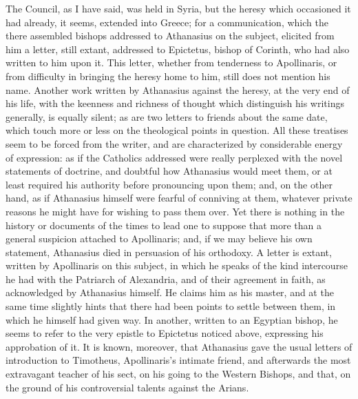 The Council, as I have said, was held in Syria, but the heresy
which occasioned it had already, it seems, extended into Greece; for a
communication, which the there assembled bishops addressed to
Athanasius on the subject, elicited from him a letter, still extant,
addressed to Epictetus, bishop of Corinth, who had also written to
him upon it. This letter, whether from tenderness to Apollinaris,
or from difficulty in bringing the heresy home to him, still does not
mention his name. Another work written by Athanasius against the
heresy, at the very end of his life, with the keenness and richness of
thought which distinguish his writings generally, is equally silent;
as are two letters to friends about the same date, which touch more or
less on the theological points in question. All these treatises seem
to be forced from the writer, and are characterized by considerable
energy of expression: as if the Catholics addressed were really
perplexed with the novel statements of doctrine, and doubtful how
Athanasius would meet them, or at least required his authority before
pronouncing upon them; and, on the other hand, as if Athanasius
himself were fearful of conniving at them, whatever private reasons he
might have for wishing to pass them over. Yet there is nothing in the
history or documents of the times to lead one to suppose that more
than a general suspicion attached to Apollinaris; and, if we may
believe his own statement, Athanasius died in persuasion of his
orthodoxy. A letter is extant, written by Apollinaris on this subject,
in which he speaks of the kind intercourse he had with the Patriarch
of Alexandria, and of their agreement in faith, as acknowledged by
Athanasius himself. He claims him as his master, and at the same time
slightly hints that there had been points to settle between them, in
which he himself had given way. In another, written to an Egyptian
bishop, he seems to refer to the very epistle to Epictetus noticed
above, expressing his approbation of it. It is known, moreover, that
Athanasius gave the usual letters of introduction to Timotheus,
Apollinaris's intimate friend, and afterwards the most extravagant
teacher of his sect, on his going to the Western Bishops, and
that, on the ground of his controversial talents against the Arians.

